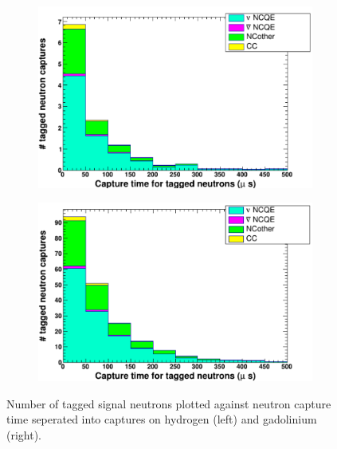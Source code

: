 \begin{figure}
    \centering
     \begin{subfigure}[b]{0.49\linewidth}
      \includegraphics[width=\linewidth]{Figures/tds_tagged_H.PNG}
     \end{subfigure}
     \begin{subfigure}[b]{0.49\linewidth}
       \includegraphics[width=\linewidth]{Figures/tds_tagged_Gd.PNG}
      \end{subfigure} 
      \caption{Number of tagged signal neutrons plotted against neutron capture time seperated into captures on hydrogen (left) and gadolinium (right).}
      \label{fig:tds_tagged_H_Gd} 
\end{figure}

